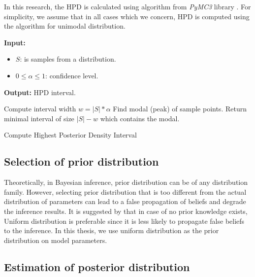 \noindent In this research, the HPD is calculated using algorithm from \textit{PyMC3} library
\cite{salvatier2016pymc3}. For simplicity, we assume that in all cases which we concern, HPD is
computed using the algorithm for unimodal distribution.
\begin{algorithm}[H]
    \footnotesize{
        \hspace*{\algorithmicindent} \textbf{Input:}
        \begin{itemize}[noitemsep,topsep=0pt]
            \item $S$: is samples from a distribution.
            \item $0\leq \alpha \leq 1$: confidence level.
        \end{itemize}
        \hspace*{\algorithmicindent} \textbf{Output:} HPD interval.
    }
    \begin{algorithmic}[1]
        \State Compute interval width $w = |S| * \alpha$
        \State Find modal (peak) of sample points.
        \State Return minimal interval of size $|S| - w$ which contains the modal.
        \EndProcedure
    \end{algorithmic}
    \caption{Compute Highest Posterior Density Interval}
    \label{alg:hpd}
\end{algorithm}

\subsection{Selection of prior distribution}
Theoretically, in Bayesian inference, prior distribution can be of any distribution family. However,
selecting prior distribution that is too different from the actual distribution of parameters
can lead to a false propagation of beliefs and degrade the inference results. It is suggested by
\cite{polgreen2016data} that in case of no prior knowledge exists, Uniform distribution is
preferable since it is less likely to propagate false beliefs to the inference. In this thesis, we
use uniform distribution as the prior distribution on model parameters.

\subsection{Estimation of posterior distribution}
